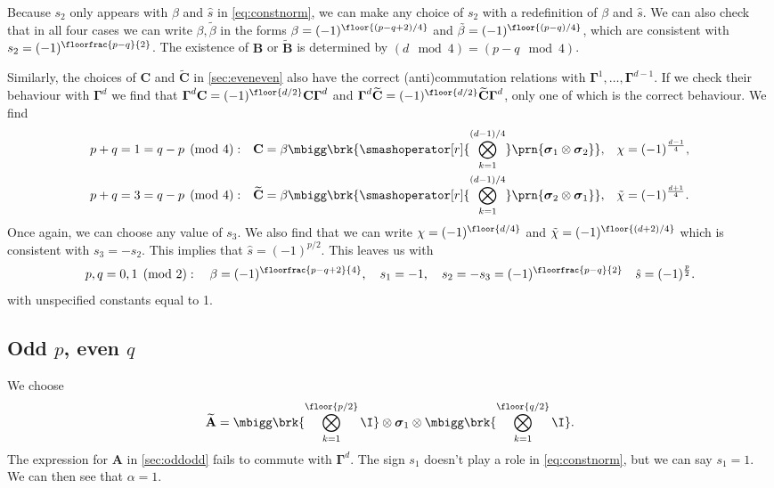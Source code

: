 \documentclass[11pt]{article}
\newcommand{\Gammab}{\boldsymbol{\Gamma}}
\newcommand{\A}{\mathbf{A}}
\newcommand{\B}{\mathbf{B}}
\renewcommand{\C}{\mathbf{C}}
\newcommand{\At}{\widetilde{\A}}
\newcommand{\Bt}{\widetilde{\B}}
\newcommand{\Ct}{\widetilde{\C}}
\newcommand{\sigmab}{\boldsymbol{\sigma}}
\newcommand{\betat}{\tilde{\beta}}
\newcommand{\chit}{\tilde{\chi}}
\begin{document}
Because $s_2$ only appears with $\beta$ and $\hat{s}$ in \cref{eq:constnorm}, we can make any choice of $s_2$ with a redefinition of $\beta$ and $\hat{s}$.
We can also check that in all four cases we can write $\beta, \betat$ in the forms $\beta = (-1)^{\floor{(p-q+2)/4}}$ and $\betat = (-1)^{\floor{(p-q)/4}}$, 
which are consistent with \(s_2 = (-1)^{\floorfrac{p-q}{2}}\).
The existence of $\B$ or $\Bt$ is determined by $(d \mod 4) = (p-q \mod 4)$.

Similarly, the choices of $\C$ and $\Ct$ in \cref{sec:eveneven} also have the correct (anti)commutation relations with $\Gammab^1, \ldots, \Gammab^{d-1}$.
If we check their behaviour with $\Gammab^d$ we find that $\Gammab^d \C = (-1)^{\floor{d/2}}\C \Gammab^d$ and $\Gammab^d \Ct = (-1)^{\floor{d/2}} \Ct \Gammab^d$, only one of which is the correct behaviour.
We find
%
\begin{equation*}
\begin{aligned}
  p+q &= 1 = q-p \pmod 4: &
  \C &= \beta \mbigg\brk{\smashoperator[r]{\bigotimes_{k=1}^{(d-1)/4}}
        \prn{\sigmab_1 \otimes \sigmab_2}}, &
  \chi &= (-1)^{\frac{d-1}{4}},
  \\
  p+q &= 3 = q-p \pmod 4: &
  \Ct &= \beta \mbigg\brk{\smashoperator[r]{\bigotimes_{k=1}^{(d-1)/4}}
        \prn{\sigmab_2 \otimes \sigmab_1}}, &
  \chit &= (-1)^{\frac{d+1}{4}}.
\end{aligned}
\end{equation*}
%
Once again, we can choose any value of $s_3$.
We also find that we can write $\chi = (-1)^{\floor{d/4}}$ and $\chit = (-1)^{\floor{(d+2)/4}}$ which is consistent with \(s_3 = -s_2\).
This implies that $\hat{s} = (-1)^{p/2}$.
This leaves us with
%
\begin{equation}\label{eq:constevenodd}
  p, q = 0,1 \pmod 2 : \quad
  \beta = (-1)^{\floorfrac{p-q+2}{4}}, \quad
  s_1 = -1, \quad
  s_2 = -s_3 = (-1)^{\floorfrac{p-q}{2}} \quad
  \hat{s} = (-1)^{\frac{p}{2}}.
\end{equation}
%
with unspecified constants equal to 1.



\subsection{Odd \texorpdfstring{$p$}{p}, even \texorpdfstring{$q$}{q}}\label{sec:oddeven}

We choose
%
\begin{equation*}
  \At =
        \mbigg\brk{\bigotimes_{k=1}^{\floor{p/2}} \I}
        \otimes \sigmab_1
        \otimes \mbigg\brk{\bigotimes_{k=1}^{\floor{q/2}} \I}.
\end{equation*}
%
The expression for $\A$ in \cref{sec:oddodd} fails to commute with $\Gammab^d$.
The sign $s_1$ doesn't play a role in \cref{eq:constnorm}, but we can say $s_1 = 1$.
We can then see that $\alpha = 1$.
\end{document}
